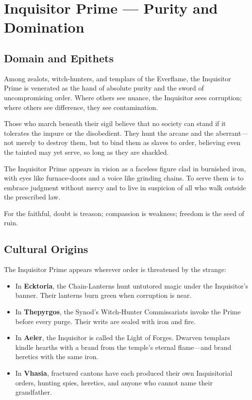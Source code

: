 \section{Inquisitor Prime — Purity and Domination}

\subsection{Domain and Epithets}

Among zealots, witch-hunters, and templars of the Everflame, the Inquisitor Prime is venerated as the hand of absolute purity and the sword of uncompromising order. Where others see nuance, the Inquisitor sees corruption; where others see difference, they see contamination.

Those who march beneath their sigil believe that no society can stand if it tolerates the impure or the disobedient. They hunt the arcane and the aberrant—not merely to destroy them, but to bind them as slaves to order, believing even the tainted may yet serve, so long as they are shackled.

The Inquisitor Prime appears in vision as a faceless figure clad in burnished iron, with eyes like furnace-doors and a voice like grinding chains. To serve them is to embrace judgment without mercy and to live in suspicion of all who walk outside the prescribed law.

For the faithful, doubt is treason; compassion is weakness; freedom is the seed of ruin.

\subsection{Cultural Origins}

The Inquisitor Prime appears wherever order is threatened by the strange:

\begin{itemize}
\item In \textbf{Ecktoria}, the Chain-Lanterns hunt untutored magic under the Inquisitor's banner. Their lanterns burn green when corruption is near.
\item In \textbf{Thepyrgos}, the Synod's Witch-Hunter Commissariats invoke the Prime before every purge. Their writs are sealed with iron and fire.
\item In \textbf{Aeler}, the Inquisitor is called the Light of Forges. Dwarven templars kindle hearths with a brand from the temple's eternal flame—and brand heretics with the same iron.
\item In \textbf{Vhasia}, fractured cantons have each produced their own Inquisitorial orders, hunting spies, heretics, and anyone who cannot name their grandfather.
\end{itemize}


